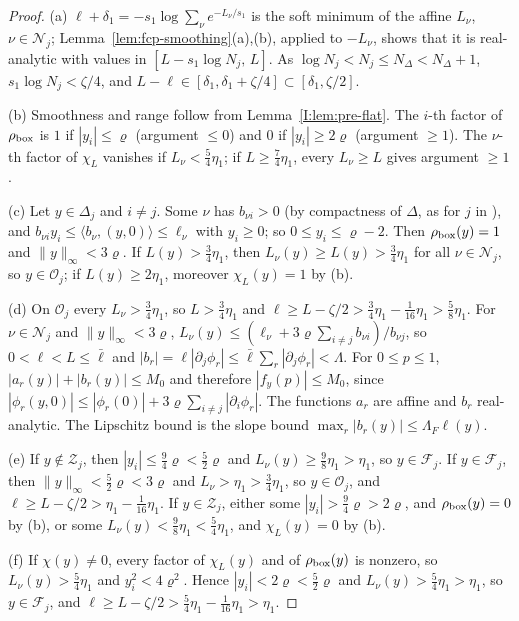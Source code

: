\begin{proof}
(a) $\ell+\delta_1=-s_1\log\sum_\nu e^{-L_\nu/s_1}$ is the soft minimum of the affine $L_\nu$, $\nu\in\mathcal N_j$;
Lemma~\ref{lem:fcp-smoothing}(a),(b), applied to $-L_\nu$, shows that it is real-analytic with values in
$[L-s_1\log N_j,\,L]$. As $\log N_j<N_j\le N_\Delta<N_\Delta+1$, $s_1\log N_j<\zeta/4$, and $L-\ell\in[\delta_1,\delta_1+\zeta/4]\subset[\delta_1,\zeta/2]$.

(b) Smoothness and range follow from Lemma~\ref{I:lem:pre-flat}. The $i$-th factor of $\rho_{\rm box}$ is $1$ if $|y_i|\le\varrho$
(argument $\le0$) and $0$ if $|y_i|\ge2\varrho$ (argument $\ge1$). The $\nu$-th factor of $\chi_L$ vanishes if
$L_\nu<\frac54\eta_1$; if $L\ge\frac74\eta_1$, every $L_\nu\ge L$ gives argument $\ge1$.

(c) Let $y\in\Delta_j$ and $i\ne j$. Some $\nu$ has $b_{\nu i}>0$ (by compactness of $\Delta$, as for $j$ in
), and $b_{\nu i}y_i\le\langle b_\nu,(y,0)\rangle\le\ell_\nu$ with $y_i\ge0$; so $0\le y_i\le\varrho-2$. Then
$\rho_{\rm box}(y)=1$ and $\|y\|_\infty<3\varrho$. If $L(y)>\frac34\eta_1$, then $L_\nu(y)\ge L(y)>\frac34\eta_1$ for all $\nu\in\mathcal N_j$,
so $y\in\mathcal O_j$; if $L(y)\ge2\eta_1$, moreover $\chi_L(y)=1$ by (b).

(d) On $\mathcal O_j$ every $L_\nu>\frac34\eta_1$, so $L>\frac34\eta_1$ and $\ell\ge L-\zeta/2>\frac34\eta_1-\frac1{16}\eta_1>\frac58\eta_1$. For
$\nu\in\mathcal N_j$ and $\|y\|_\infty<3\varrho$, $L_\nu(y)\le(\ell_\nu+3\varrho\sum_{i\ne j}b_{\nu i})/b_{\nu j}$, so $0<\ell<L\le\bar\ell$ and
$|b_r|=\ell|\partial_j\phi_r|\le\bar\ell\sum_r|\partial_j\phi_r|<\Lambda$. For $0\le p\le1$, $|a_r(y)|+|b_r(y)|\le M_0$ and therefore $|f_y(p)|\le M_0$, since
$|\phi_r(y,0)|\le|\phi_r(0)|+3\varrho\sum_{i\ne j}|\partial_i\phi_r|$. The functions $a_r$ are affine and $b_r$ real-analytic. The Lipschitz
bound is the slope bound $\max_r|b_r(y)|\le\Lambda_F\ell(y)$.

(e) If $y\notin\mathcal Z_j$, then $|y_i|\le\frac94\varrho<\frac52\varrho$ and $L_\nu(y)\ge\frac98\eta_1>\eta_1$, so $y\in\mathcal F_j$. If
$y\in\mathcal F_j$, then $\|y\|_\infty<\frac52\varrho<3\varrho$ and $L_\nu>\eta_1>\frac34\eta_1$, so $y\in\mathcal O_j$, and
$\ell\ge L-\zeta/2>\eta_1-\frac1{16}\eta_1$. If $y\in\mathcal Z_j$, either some $|y_i|>\frac94\varrho>2\varrho$, and $\rho_{\rm box}(y)=0$ by (b),
or some $L_\nu(y)<\frac98\eta_1<\frac54\eta_1$, and $\chi_L(y)=0$ by (b).

(f) If $\chi(y)\ne0$, every factor of $\chi_L(y)$ and of $\rho_{\rm box}(y)$ is nonzero, so $L_\nu(y)>\frac54\eta_1$ and
$y_i^2<4\varrho^2$. Hence $|y_i|<2\varrho<\frac52\varrho$ and $L_\nu(y)>\frac54\eta_1>\eta_1$, so
$y\in\mathcal F_j$, and $\ell\ge L-\zeta/2>\frac54\eta_1-\frac1{16}\eta_1>\eta_1$.
\end{proof}

